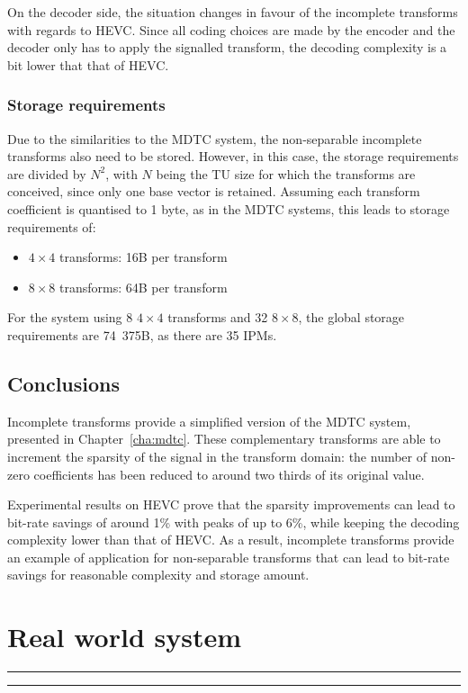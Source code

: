 \documentclass[11pt,a4paper,openright,twoside]{book}
\providecommand{\chaptertoc}{
	\startcontents[chapters]
	\hrule
	\vspace{1em}
	\printcontents[chapters]{}{1}{{\bf\large Contents}}
	\hrule
}
\numberwithin{equation}{section} %
\numberwithin{figure}{section} %
\numberwithin{table}{section} %
\begin{document}
On the decoder side, the situation changes in favour of the incomplete
transforms with regards to \ac{HEVC}.
Since all coding choices are made by the encoder and the decoder only has to
apply the signalled transform, the decoding complexity is a bit lower that
that of \ac{HEVC}.

\subsection{Storage requirements}
\label{sub:it_storage_requirements}

Due to the similarities to the \ac{MDTC} system, the non-separable incomplete
transforms also need to be stored.
However, in this case, the storage requirements are divided by $N^2$, with $N$
being the \ac{TU} size for which the transforms are conceived, since only one
base vector is retained.
Assuming each transform coefficient is quantised to 1 byte, as in the
\ac{MDTC} systems, this leads to storage requirements of:
\begin{itemize}
	\item $4\times4$ transforms: \unit{16}{B} per transform
	\item $8\times8$ transforms: \unit{64}{B} per transform
\end{itemize}
For the system using 8 $4\times4$ transforms and 32 $8\times8$, the global
storage requirements are \unit{74.375}{\kilo B}, as there are 35 \acp{IPM}.

\section{Conclusions}
\label{sec:it_conclusions}

Incomplete transforms provide a simplified version of the \ac{MDTC} system,
presented in Chapter~\ref{cha:mdtc}.
These complementary transforms are able to increment the sparsity of the
signal in the transform domain:
the number of non-zero coefficients has been reduced to around two thirds of
its original value.

Experimental results on \ac{HEVC} prove that the sparsity improvements can
lead to bit-rate savings of around 1\% with peaks of up to 6\%, while keeping
the decoding complexity lower than that of \ac{HEVC}.
As a result, incomplete transforms provide an example of application for
non-separable transforms that can lead to bit-rate savings for reasonable
complexity and storage amount.

\chapter{Real world system}
\label{cha:real_world_system}
\chaptertoc
\end{document}
